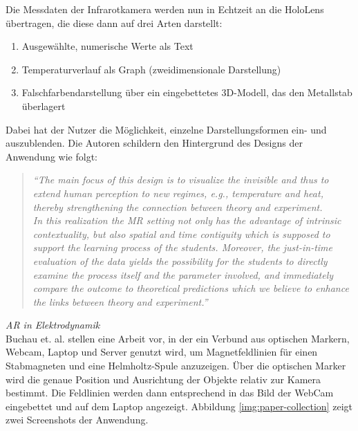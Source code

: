 Die Messdaten der Infrarotkamera werden nun in Echtzeit an die HoloLens übertragen, die diese dann auf drei Arten darstellt:
\begin{enumerate}
	\setlength{\itemsep}{-2pt}
	\item Ausgewählte, numerische Werte als Text
	\item Temperaturverlauf als Graph (zweidimensionale Darstellung)
	\item Falschfarbendarstellung über ein eingebettetes 3D-Modell, das den Metallstab überlagert
\end{enumerate}
Dabei hat der Nutzer die Möglichkeit, einzelne Darstellungsformen ein- und auszublenden. Die Autoren schildern den Hintergrund des Designs der Anwendung wie folgt:
\begin{quote}
	\textit{``The main focus of this design is to visualize the invisible and thus to extend human perception to new regimes, e.g., temperature and heat, thereby strengthening the connection between theory and experiment.\\ 
	In this realization the MR setting not only has the advantage of intrinsic contextuality, but also spatial and time contiguity which is supposed to support the learning process of the students. Moreover, the just-in-time evaluation of the data yields the possibility for the students to directly examine the process itself and the parameter involved, and immediately compare the outcome to theoretical predictions which we believe to enhance the links between theory and experiment.''}
\end{quote}

\vspace{4px}
\textit{AR in Elektrodynamik}\\
Buchau et. al. stellen eine Arbeit vor, in der ein Verbund aus optischen Markern, Webcam, Laptop und Server genutzt wird, um Magnetfeldlinien für einen Stabmagneten und eine Helmholtz-Spule anzuzeigen. Über die optischen Marker wird die genaue Position und Ausrichtung der Objekte relativ zur Kamera bestimmt. Die Feldlinien werden dann entsprechend in das Bild der WebCam eingebettet und auf dem Laptop angezeigt. Abbildung \ref{img:paper-collection} zeigt zwei Screenshots der Anwendung.\\

